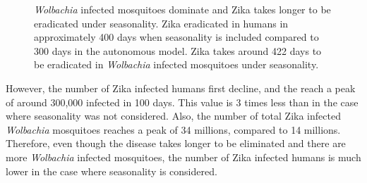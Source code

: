 \documentclass{ws-rv9x6}
\begin{document}

\begin{figure}[H]
    \centering
    
    \makebox[0pt][l]{}%
    \makebox[0pt][l]{}%
    \caption{\textit{Wolbachia} infected mosquitoes dominate and Zika takes longer to be eradicated under seasonality.  Zika eradicated in humans in approximately 400 days when seasonality is included compared to 300 days in the autonomous model. Zika takes around 422 days to be eradicated in \textit{Wolbachia} infected mosquitoes under seasonality.}
    \label{nonautonoum6b}
\end{figure}

However, the number of Zika infected humans first decline, and the reach a peak of around 300,000 infected in 100 days. This value is 3 times less than in the case where seasonality was not considered. Also, the number of total Zika infected \textit{Wolbachia} mosquitoes reaches a peak of 34 millions, compared to 14 millions. Therefore, even though the disease takes longer to be eliminated and there are more \textit{Wolbachia} infected mosquitoes, the number of Zika infected humans is much lower in the case where seasonality is considered. 
\end{document}
